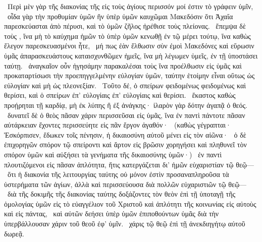 ~Περὶ μὲν γὰρ τῆς διακονίας τῆς εἰς τοὺς ἁγίους περισσόν μοί ἐστιν τὸ γράφειν ὑμῖν,
~οἶδα γὰρ τὴν προθυμίαν ὑμῶν ἣν ὑπὲρ ὑμῶν καυχῶμαι Μακεδόσιν ὅτι Ἀχαΐα παρεσκεύασται ἀπὸ πέρυσι, καὶ τὸ ὑμῶν ζῆλος ἠρέθισε τοὺς πλείονας.
~ἔπεμψα δὲ τοὺς , ἵνα μὴ τὸ καύχημα ἡμῶν τὸ ὑπὲρ ὑμῶν κενωθῇ ἐν τῷ μέρει τούτῳ, ἵνα καθὼς ἔλεγον παρεσκευασμένοι ἦτε,
~μή πως ἐὰν ἔλθωσιν σὺν ἐμοὶ Μακεδόνες καὶ εὕρωσιν ὑμᾶς ἀπαρασκευάστους καταισχυνθῶμεν ἡμεῖς, ἵνα μὴ λέγωμεν ὑμεῖς, ἐν τῇ ὑποστάσει ταύτῃ.
~ἀναγκαῖον οὖν ἡγησάμην παρακαλέσαι τοὺς  ἵνα προέλθωσιν εἰς ὑμᾶς καὶ προκαταρτίσωσι τὴν προεπηγγελμένην εὐλογίαν ὑμῶν, ταύτην ἑτοίμην εἶναι οὕτως ὡς εὐλογίαν καὶ μὴ ὡς πλεονεξίαν.
~Τοῦτο δέ, ὁ σπείρων φειδομένως φειδομένως καὶ θερίσει, καὶ ὁ σπείρων ἐπ’ εὐλογίαις ἐπ’ εὐλογίαις καὶ θερίσει.
~ἕκαστος καθὼς προῄρηται τῇ καρδίᾳ, μὴ ἐκ λύπης ἢ ἐξ ἀνάγκης· ἱλαρὸν γὰρ δότην ἀγαπᾷ ὁ θεός.
~δυνατεῖ δὲ ὁ θεὸς πᾶσαν χάριν περισσεῦσαι εἰς ὑμᾶς, ἵνα ἐν παντὶ πάντοτε πᾶσαν αὐτάρκειαν ἔχοντες περισσεύητε εἰς πᾶν ἔργον ἀγαθόν·
~(καθὼς γέγραπται· Ἐσκόρπισεν, ἔδωκεν τοῖς πένησιν, ἡ δικαιοσύνη αὐτοῦ μένει εἰς τὸν αἰῶνα·
~ὁ δὲ ἐπιχορηγῶν σπόρον τῷ σπείροντι καὶ ἄρτον εἰς βρῶσιν χορηγήσει καὶ πληθυνεῖ τὸν σπόρον ὑμῶν καὶ αὐξήσει τὰ γενήματα τῆς δικαιοσύνης ὑμῶν·)
~ἐν παντὶ πλουτιζόμενοι εἰς πᾶσαν ἁπλότητα, ἥτις κατεργάζεται δι’ ἡμῶν εὐχαριστίαν τῷ θεῷ—
~ὅτι ἡ διακονία τῆς λειτουργίας ταύτης οὐ μόνον ἐστὶν προσαναπληροῦσα τὰ ὑστερήματα τῶν ἁγίων, ἀλλὰ καὶ περισσεύουσα διὰ πολλῶν εὐχαριστιῶν τῷ θεῷ—
~διὰ τῆς δοκιμῆς τῆς διακονίας ταύτης δοξάζοντες τὸν θεὸν ἐπὶ τῇ ὑποταγῇ τῆς ὁμολογίας ὑμῶν εἰς τὸ εὐαγγέλιον τοῦ Χριστοῦ καὶ ἁπλότητι τῆς κοινωνίας εἰς αὐτοὺς καὶ εἰς πάντας,
~καὶ αὐτῶν δεήσει ὑπὲρ ὑμῶν ἐπιποθούντων ὑμᾶς διὰ τὴν ὑπερβάλλουσαν χάριν τοῦ θεοῦ ἐφ’ ὑμῖν.
~χάρις τῷ θεῷ ἐπὶ τῇ ἀνεκδιηγήτῳ αὐτοῦ δωρεᾷ.

